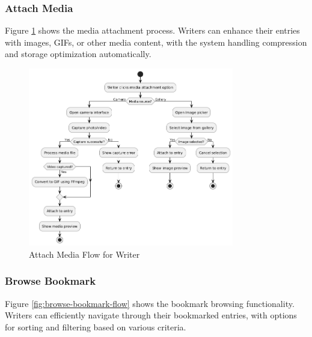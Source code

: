 \subsubsection{Attach Media}\label{subsubsec:attachMedia}

Figure \ref{fig:attach-media-flow} shows the media attachment process. Writers can enhance their entries with images, GIFs, or other media content, with the system handling compression and storage optimization automatically.

\begin{figure}[H]
\centering
\includegraphics[width=0.8\textwidth]{files/imgs/attach_media_flow.png}
\caption{Attach Media Flow for Writer}
\label{fig:attach-media-flow}
\end{figure}

\subsubsection{Browse Bookmark}\label{subsubsec:browseBookmark}

Figure \ref{fig:browse-bookmark-flow} shows the bookmark browsing functionality. Writers can efficiently navigate through their bookmarked entries, with options for sorting and filtering based on various criteria.

